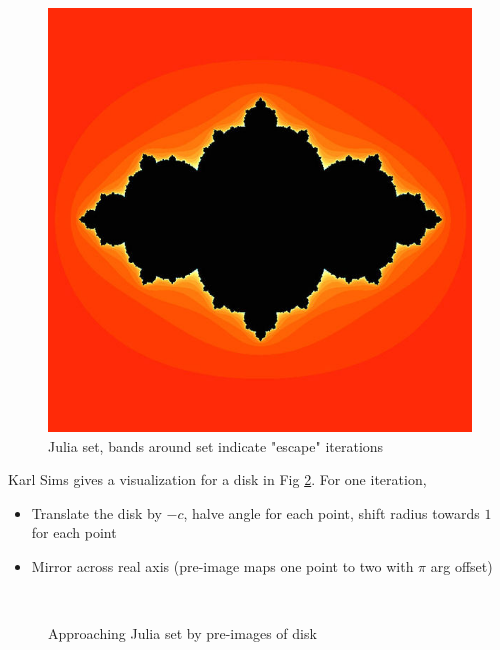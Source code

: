 \documentclass{article}
\begin{document}
\begin{figure}[h!]
    \centering
    \includegraphics[width=.4\linewidth]{images/600px-Time_escape_Julia_set.jpg}
    \caption{Julia set, bands around set indicate "escape" iterations \cite{JuliaTimeEscape}}
    \label{fig:julia_escape}
\end{figure}

Karl Sims gives a visualization for a disk in Fig \ref{fig:karlsims_preimage}. For one iteration,
\begin{itemize}
    \item Translate the disk by $-c$, halve angle for each point, shift radius towards $1$ for each point
    \item Mirror across real axis (pre-image maps one point to two with $\pi$ arg offset)
\end{itemize}

\begin{figure}[htbp!]
    \setlength{\abovecaptionskip}{0pt}
    \captionsetup[subfigure]{labelformat=empty}
    \centering
     \\[-3ex]%
    \caption{Approaching Julia set by pre-images of disk \cite{KarlSims}} %
    \label{fig:karlsims_preimage}%
\end{figure}%
\end{document}
